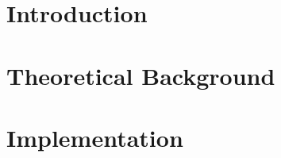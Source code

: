 \documentclass[twoside]{ctuthesis}
\begin{document}
\maketitle %

\part{Introduction}




\part{Theoretical Background}







\part{Implementation}





 
\appendix %

\printbibliography

\end{document}
